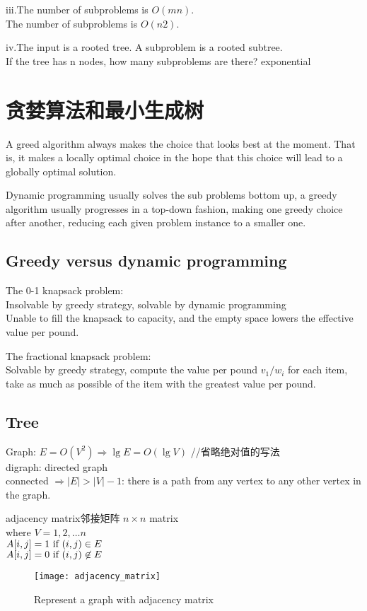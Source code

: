 \documentclass{article}
\begin{document}
iii.The number of subproblems is $O(mn)$.\\
The number of subproblems is $O(n2)$.

iv.The input is a rooted tree. A subproblem is a rooted subtree.\\
If the tree has n nodes, how many subproblems are there? exponential

\section{贪婪算法和最小生成树}
A greed algorithm always makes the choice that looks best at the moment. That is, it makes a locally optimal choice in the hope that this choice will lead to a globally optimal solution.

Dynamic programming usually solves the sub problems bottom up, a greedy algorithm usually progresses in a top-down fashion, making one greedy choice after another, reducing each given problem instance to a smaller one.

\subsection{Greedy versus dynamic programming}
The 0-1 knapsack problem:\\
Insolvable by greedy strategy, solvable by dynamic programming\\
Unable to fill the knapsack to capacity, and the empty space lowers the effective value per pound.

The fractional knapsack problem:\\
Solvable by greedy strategy, compute the value per pound $v_1/w_i$ for each item, take as much as possible of the item with the greatest value per pound.

\subsection{Tree}
\noindent
Graph: $E = O(V^2) \Rightarrow \lg E = O(\lg V)$  //省略绝对值的写法\\
digraph: directed graph\\
connected $\Rightarrow |E| > |V| - 1$: there is a path from any vertex to any other vertex in the graph.

adjacency matrix邻接矩阵 $n \times n$ matrix\\
where $V={1,2, … n}$\\
$A[i,j] = 1 \textrm{\ if } (i,j) \in E$\\
$A[i,j] = 0 \textrm{\ if } (i,j) \not \in E$
\begin{figure}[htbp]
  \centering
  \texttt{[image: adjacency\_matrix]}\\
  \caption{Represent a graph with adjacency matrix}\label{fig.adjacency.matrix}
\end{figure}
\end{document}
